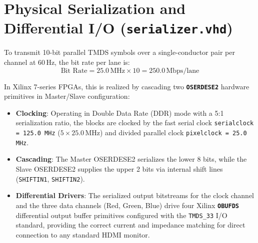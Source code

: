 \section{Physical Serialization and Differential I/O (\texttt{serializer.vhd})}
To transmit 10-bit parallel TMDS symbols over a single-conductor pair per channel at $60\,\text{Hz}$, the bit rate per lane is:
\begin{equation}
\text{Bit Rate} = 25.0\,\text{MHz} \times 10 = 250.0\,\text{Mbps/lane}
\end{equation}

In Xilinx 7-series FPGAs, this is realized by cascading two \textbf{\texttt{OSERDESE2}} hardware primitives in Master/Slave configuration:
\begin{itemize}
    \item \textbf{Clocking}: Operating in Double Data Rate (DDR) mode with a 5:1 serialization ratio, the blocks are clocked by the fast serial clock \texttt{serialclock = 125.0 MHz} ($5 \times 25.0\,\text{MHz}$) and divided parallel clock \texttt{pixelclock = 25.0 MHz}.
    \item \textbf{Cascading}: The Master OSERDESE2 serializes the lower 8 bits, while the Slave OSERDESE2 supplies the upper 2 bits via internal shift lines (\texttt{SHIFTIN1}, \texttt{SHIFTIN2}).
    \item \textbf{Differential Drivers}: The serialized output bitstreams for the clock channel and the three data channels (Red, Green, Blue) drive four Xilinx \textbf{\texttt{OBUFDS}} differential output buffer primitives configured with the \texttt{TMDS\_33} I/O standard, providing the correct current and impedance matching for direct connection to any standard HDMI monitor.
\end{itemize}
